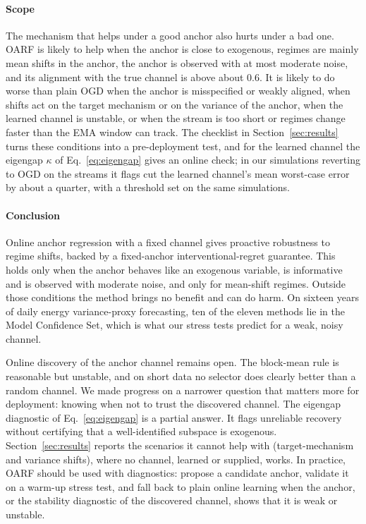 \documentclass[authoryear,preprint,12pt]{elsarticle}
\theoremstyle{plain}
\theoremstyle{remark}
\newcommand{\OARF}{\textsc{OARF}}
\begin{document}
\paragraph{Scope}
The mechanism that helps under a good anchor also hurts under a bad one. \OARF{} is
likely to help when the anchor is close to exogenous, regimes are mainly mean shifts
in the anchor, the anchor is observed with at most moderate noise, and its alignment
with the true channel is above about $0.6$. It is likely to do worse than plain OGD
when the anchor is misspecified or weakly aligned, when shifts act on the target
mechanism or on the variance of the anchor, when the learned channel is unstable, or
when the stream is too short or regimes change faster than the EMA window can track. The checklist in
Section~\ref{sec:results} turns these conditions into a pre-deployment test, and for
the learned channel the eigengap $\kappa$ of Eq.~\eqref{eq:eigengap} gives an online
check; in our simulations reverting to OGD on the streams it flags cut the learned
channel's mean worst-case error by about a quarter, with a threshold set on the same
simulations.

\paragraph{Conclusion} Online anchor regression with a fixed channel gives proactive
robustness to regime shifts, backed by a fixed-anchor interventional-regret guarantee.
This holds only when the anchor behaves like an exogenous variable, is informative and
is observed with moderate noise, and only for mean-shift regimes. Outside those
conditions the method brings no benefit and can do harm. On sixteen years of daily energy variance-proxy forecasting, ten of the eleven methods lie in the Model Confidence Set, which is what our stress tests predict for a weak, noisy channel.

Online discovery of the anchor channel remains open. The block-mean rule is
reasonable but unstable, and on short data no selector does clearly better than a random channel. We made progress on a narrower
question that matters more for deployment: knowing when not to trust the discovered
channel. The eigengap diagnostic of Eq.~\eqref{eq:eigengap} is a partial
answer. It flags unreliable recovery without certifying that a well-identified subspace
is exogenous. Section~\ref{sec:results} reports the scenarios it cannot help with
(target-mechanism and variance shifts), where no channel, learned or supplied, works.
In practice, \OARF{} should be used with diagnostics: propose a candidate anchor,
validate it on a warm-up stress test, and fall back to plain online learning when the anchor, or the stability diagnostic of the discovered
channel, shows that it is weak or unstable.
\end{document}
